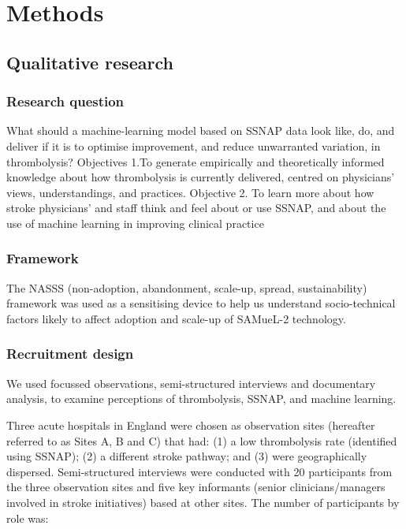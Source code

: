 \section{Methods}

\subsection{Qualitative research}

\subsubsection{Research question}

What should a machine-learning model based on SSNAP data look like, do, and deliver if it is to optimise improvement, and reduce unwarranted variation, in thrombolysis? 
Objectives 1.To generate empirically and theoretically informed knowledge about how thrombolysis is currently delivered, centred on physicians’ views, understandings, and practices.
Objective 2. To learn more about how stroke physicians’ and staff think and feel about or use SSNAP, and about the use of machine learning in improving clinical practice

\subsubsection{Framework}

The NASSS (non-adoption, abandonment, scale-up, spread, sustainability) framework \cite{greenhalgh_beyond_2017} was used as a sensitising device to help us understand socio-technical factors likely to affect adoption and scale-up of SAMueL-2 technology.

\subsubsection{Recruitment design}

We used focussed observations, semi-structured interviews and documentary analysis, to examine perceptions of thrombolysis, SSNAP, and machine learning. 

Three acute hospitals in England were chosen as observation sites (hereafter referred to as Sites A, B and C) that had: (1) a low thrombolysis rate (identified using SSNAP); (2) a different stroke pathway; and (3) were geographically dispersed. Semi-structured interviews were conducted with 20 participants from the three observation sites and five key informants (senior clinicians/managers involved in stroke initiatives) based at other sites. The number of participants by role was:

